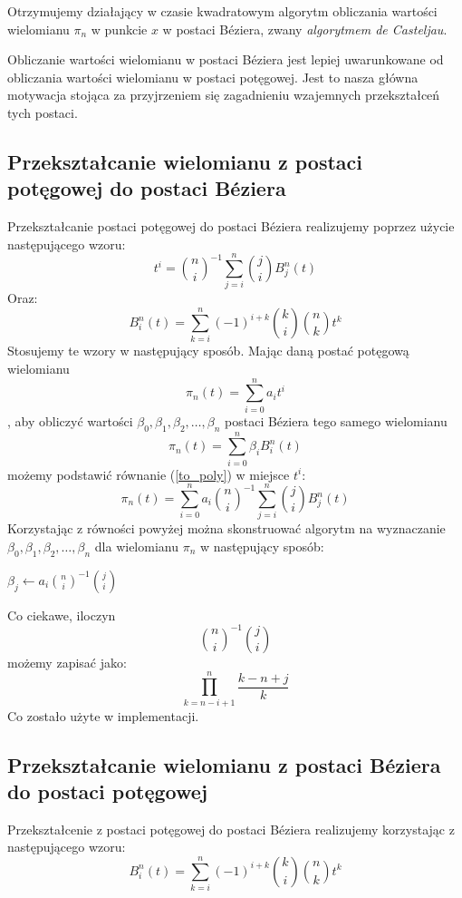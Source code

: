 \documentclass[wide, 11pt]{mwart}
\begin{document}
Otrzymujemy działający w czasie kwadratowym algorytm obliczania wartości
wielomianu $\pi_n$ w punkcie $x$ w postaci Béziera, zwany 
\emph{algorytmem de Casteljau}.

Obliczanie wartości wielomianu w postaci Béziera jest lepiej uwarunkowane od
obliczania wartości wielomianu w postaci potęgowej. Jest to nasza główna
motywacja stojąca za przyjrzeniem się zagadnieniu wzajemnych przekształceń tych
postaci.

\subsection{Przekształcanie wielomianu z postaci potęgowej do postaci Béziera}
Przekształcanie postaci potęgowej do postaci Béziera realizujemy poprzez użycie
następującego wzoru:
\begin{equation}
  \label{to_poly}
  t^i = {n \choose i}^{-1}{\sum_{j=i}^n}{j \choose i}B^n_j(t) 
\end{equation}
Oraz:
\begin{equation}
  B^n_i(t) = {\sum_{k=i}^n}(-1)^{i+k}{k \choose i}{n \choose k}t^k
\end{equation}
Stosujemy te wzory w następujący sposób. Mając daną postać potęgową wielomianu 
\[\pi_n(t) = {\sum_{i=0}^n}a_it^i\], aby obliczyć wartości $\beta_0, \beta_1, 
\beta_2, \ldots, \beta_n$ postaci Béziera tego samego wielomianu 
\[\pi_n(t) = {\sum_{i=0}^n}\beta_iB^n_i(t)\] możemy podstawić równanie 
(\ref{to_poly}) w miejsce $t^i$:
\begin{equation}
  \pi_n(t) = 
  {\sum_{i=0}^n}a_i{n \choose i}^{-1}{\sum_{j=i}^n}{j \choose i}B^n_j(t)
\end{equation}
\newpage
Korzystając z równości powyżej można skonstruować algorytm na wyznaczanie 
$\beta_0, \beta_1, \beta_2, \ldots, \beta_n$
dla wielomianu $\pi_n$ w następujący sposób:
\begin{algorithmic}
      \State $\beta_j \gets a_i{n \choose i}^{-1}{j \choose i}$
    \EndFor  
  \EndFor
\end{algorithmic}
Co ciekawe, iloczyn \[{n \choose i}^{-1}{j \choose i}\] możemy zapisać jako:
\[{\prod^n_{k=n-i+1}}\frac{k-n+j}{k}\]
Co zostało użyte w implementacji.

\subsection{Przekształcanie wielomianu z postaci Béziera do postaci potęgowej}
Przekształcenie z postaci potęgowej do postaci Béziera realizujemy korzystając
z następującego wzoru:
\begin{equation}
  \label{to_bez}
  B^n_i(t) = {\sum_{k=i}^n}(-1)^{i+k}{k \choose i}{n \choose k}t^k
\end{equation}
\end{document}
